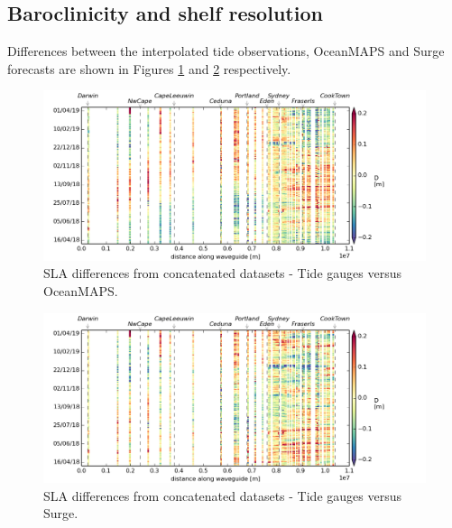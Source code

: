 \subsection{Baroclinicity and shelf resolution}
Differences between the interpolated tide observations, OceanMAPS and Surge forecasts are shown in Figures \ref{fig:diff_tide_omaps} and \ref{fig:diff_tide_surge} respectively.
\newcommand\CAPTIONc{SLA differences from concatenated datasets}
\begin{figure}[H]\centering
    \noindent\includegraphics[width=\figwidthFull]{figures/plots/interpTdiff_obs_sla_day0_d0.png}
    \caption{\CAPTIONc{} - Tide gauges versus OceanMAPS.}
    \label{fig:diff_tide_omaps}
\end{figure}

\begin{figure}[H]\centering
    \noindent\includegraphics[width=\figwidthFull]{figures/plots/interpTdiff_obs_surgeg_day0_d0.png}
    \caption{\CAPTIONc{} - Tide gauges versus Surge.}
    \label{fig:diff_tide_surge}
\end{figure}

